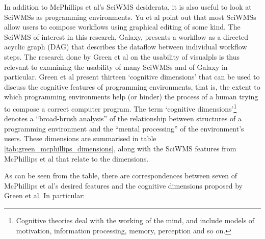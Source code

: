 \documentclass[a4paper,10pt]{scrreprt}
\begin{document}
In addition to McPhillips et al's \gls{SciWMS} desiderata, it is also useful to look at \glspl{SciWMS} as programming environments. Yu et al \cite{yu_taxonomy_2005} point out that most \glspl{SciWMS} allow users to compose \glspl{workflow} using graphical editing of some kind. The \gls{SciWMS} of interest in this research, Galaxy, presents a \gls{workflow} as a directed acyclic graph (DAG) that describes the dataflow between individual \gls{workflow} steps. The research done by Green et al \cite{green_usability_1996} on the usability of \glspl{visualpl} is thus relevant to examining the usability of many \glspl{SciWMS} and of Galaxy in particular. Green et al \cite{green_usability_1996} present thirteen `cognitive dimensions' that can be used to discuss the cognitive features of programming environments, that is, the extent to which programming environments help (or hinder) the process of a human trying to compose a correct computer program. The term `cognitive dimensions'\footnote{Cognitive theories deal 
with the working of the mind, and include models of motivation, information processing, memory, perception and so on.} denotes a ``broad-brush analysis'' of the relationship between structures of a programming environment and the ``mental processing'' of the environment's users. These dimensions are summarised in table \ref{tab:green_mcphillips_dimensions}, along with the \gls{SciWMS} features from McPhillips et al \cite{mcphillips_scientific_2009} that relate to the dimensions.

As can be seen from the table, there are correspondences between seven of McPhillips et al's desired features and the cognitive dimensions proposed by Green et al. In particular:
\end{document}
